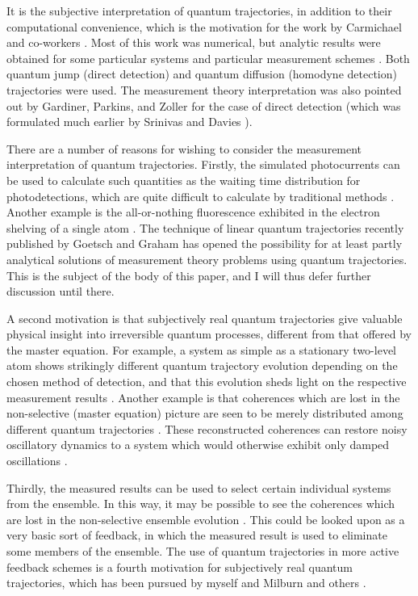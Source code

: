 It is the subjective interpretation 
of quantum trajectories, in addition to their computational convenience,  which is the
motivation for the work by Carmichael and co-workers 
\cite{Car93b,AlsCar91,TiaCar92,Car93a,CarKocTia94,KocCarMorRai95}. Most
of this work was numerical, but analytic results were obtained for  some particular
systems and particular measurement schemes  \cite{Car93a,CarKocTia94}. Both quantum 
jump (direct detection) and quantum diffusion (homodyne detection) trajectories were
used. The measurement theory interpretation was also pointed out by Gardiner,
Parkins, and Zoller \cite{GarParZol92} for the case of direct detection (which was
formulated much earlier by Srinivas and Davies \cite{SriDav81}). 

There are a number of reasons for wishing to consider the measurement 
interpretation of quantum trajectories. Firstly, the simulated photocurrents 
can be used to calculate such quantities as the waiting time distribution for 
photodetections, which are quite difficult to calculate by traditional 
methods \cite{CarSinVyaRic89}. Another example is the all-or-nothing fluorescence
exhibited in the electron shelving of a single atom \cite{Coo88,GagMil93}. The  
technique of linear quantum trajectories recently published by Goetsch and Graham
\cite{GoeGra94b} has opened the possibility for at least partly analytical
solutions of measurement theory problems using quantum trajectories. This is the
subject of the body of this paper, and I will thus defer further discussion until
there. 

A second motivation is  that subjectively real
quantum trajectories give valuable  physical insight into irreversible quantum
processes, different from that offered by the master equation. For example, a
system as simple as a stationary two-level atom shows strikingly different quantum
trajectory evolution depending on the chosen method of detection, and that this
evolution sheds light on the respective  measurement results \cite{WisMil93c}.
Another example is that coherences which are lost in the non-selective (master 
equation) picture are seen to be merely distributed among different  quantum
trajectories \cite{Car93b,AlsCar91,CarKocTia94,GoeGraHaa95a,GarKni94}. These
reconstructed coherences can restore noisy oscillatory dynamics to a
system which would otherwise exhibit only damped oscillations
\cite{QuaColWal95}.

Thirdly, the measured  results can be used to select certain individual systems from
the  ensemble. In this way, it may be possible to see the coherences which are  lost
in the non-selective ensemble evolution  \cite{CarKocTia94,KocCarMorRai95}.
This could be looked upon as a very  basic sort of feedback, in which the measured
result is used to eliminate  some members of the ensemble. The use of quantum
trajectories in more active feedback schemes is a fourth motivation for subjectively
real quantum trajectories, which has been pursued by myself and Milburn and others 
\cite{WisMil93b,WisMil94a,Wis94a,WisMil94b,LieMil95,Wis95a,Wis95b}.

